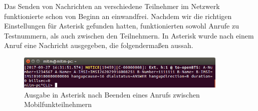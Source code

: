 Das Senden von Nachrichten an verschiedene Teilnehmer im Netzwerk funktionierte schon von Beginn an einwandfrei. Nachdem wir die richtigen Einstellungen für Asterisk gefunden hatten, funktionierten sowohl Anrufe zu Testnummern, als auch zwischen den Teilnehmern. In Asterisk wurde nach einem Anruf eine Nachricht ausgegeben, die folgendermaßen aussah.

\begin{figure}[htbp]
	\centering
		\includegraphics[width=0.9\textwidth]{includes/asterisk_call}
	\caption{Ausgabe in Asterisk nach Beenden eines Anrufs zwischen Mobilfunkteilnehmern}
	\label{fig:asterisk_call}
\end{figure}

\newpage